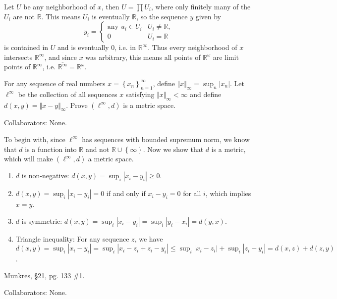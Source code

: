 \documentclass[10pt]{report}
\begin{document}
Let $U$ be any neighborhood of $x$, then $U = \prod U_i$, where only finitely many of the $U_i$ are not $\mathbb{R}$. This means $U_i$ is eventually $\mathbb{R}$, so the sequence $y$ given by
\[
y_i =
\begin{cases}
	\text{any } u_i \in U_i & U_i \neq \mathbb{R},\\
	0 & U_i = \mathbb{R}
\end{cases}
\] is contained in $U$ and is eventually 0, i.e. in $\mathbb{R}^{\infty}$. Thus every neighborhood of $x$ intersects $\mathbb{R}^{\infty}$, and since $x$ was arbitrary, this means all points of $\mathbb{R}^{\omega}$ are limit points of $\mathbb{R}^{\infty}$, i.e. $\overline{\mathbb{R}^{\infty}}=\mathbb{R}^{\omega}$.

\newpage

\begin{exer}[]
	For any sequence of real numbers $x = \left\{ x_n \right\}_{n=1}^\infty$, define ${\Vert{x}\Vert}_{\infty}=\sup_{n}|x_n|$. Let $\ell^{\infty}$ be the collection of all sequences $x$ satisfying ${\Vert{x}\Vert}_{\infty}<\infty$ and define $d(x,y)={\Vert{x-y}\Vert}_{\infty}$. Prove $(\ell^{\infty}, d)$ is a metric space.
\end{exer}
{\color{blue}Collaborators: None.}

To begin with, since $\ell^{\infty}$ has sequences with bounded supremum norm, we know that $d$ is a function into $\mathbb{R}$ and not $\mathbb{R}\cup\left\{ \infty \right\}$. Now we show that $d$ is a metric, which will make $\left( \ell^{\infty}, d \right)$ a metric space.

\begin{enumerate}
	\item $d $ is non-negative: $d(x,y) = \sup_{i}|x_i-y_i|\geq 0$.
	\item $d(x,y)=\sup_{i}|x_i-y_i|=0$ if and only if $x_i-y_i=0$ for all $i$, which implies  $x=y$.
	\item $d$ is symmetric: $d(x,y) = \sup_{i}|x_i-y_i|=\sup_i|y_i-x_i| =d(y,x)$.
	\item Triangle inequality: For any sequence $z$, we have $d(x,y) = \sup_i|x_i-y_i|=\sup_i|x_i-z_i+z_i-y_i|\leq \sup_i|x_i-z_i|+\sup_i|z_i-y_i|=d(x,z)+d(z,y)$.
\end{enumerate}


\begin{exer}[]
Munkres, \S 21, pg. 133 \#1.
\end{exer}
{\color{blue}Collaborators: None.}
\end{document}
